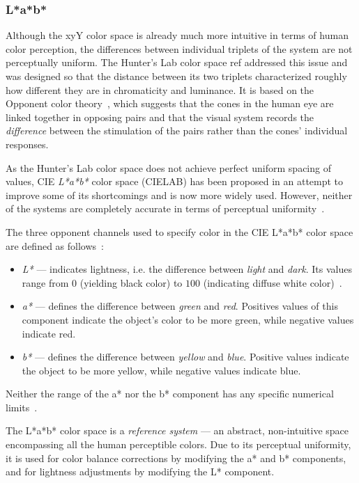 \subsubsection{L*a*b*}

Although the xyY color space is already much more intuitive in terms of human color perception, the differences between individual triplets of the system are not perceptually uniform. The Hunter's Lab color space ref addressed this issue and was designed so that the distance between its two triplets characterized roughly how different they are in chromaticity and luminance. It is based on the Opponent color theory~\cite{opponentColorTheory}, which suggests that the cones in the human eye are linked together in opposing pairs and that the visual system records the \emph{difference} between the stimulation of the pairs rather than the cones' individual responses.

As the Hunter's Lab color space does not achieve perfect uniform spacing of values, CIE \emph{L*a*b*} color space (CIELAB) has been proposed in an attempt to improve some of its shortcomings and is now more widely used. However, neither of the systems are completely accurate in terms of perceptual uniformity~\cite{hunterLabCIELabComparison}.

The three opponent channels used to specify color in the CIE L*a*b* color space are defined as follows~\cite{labColorScale}:
\begin{itemize}
	\item \emph{L*} --- indicates lightness, i.e. the difference between \emph{light} and \emph{dark}. Its values range from $0$ (yielding black color) to $100$ (indicating diffuse white color)~\cite{labColorScale}.
	\item \emph{a*} --- defines the difference between \emph{green} and \emph{red}. Positives values of this component indicate the object's color to be more green, while negative values indicate red.
	\item \emph{b*} --- defines the difference between \emph{yellow} and \emph{blue}. Positive values indicate the object to be more yellow, while negative values indicate blue.
\end{itemize}
Neither the range of the a* nor the b* component has any specific numerical limits~\cite{labColorScale}.

The L*a*b* color space is a \emph{reference system} --- an abstract, non-intuitive space encompassing all the human perceptible colors. Due to its perceptual uniformity, it is used for color balance corrections by modifying the a* and b* components, and for lightness adjustments by modifying the L* component. 

